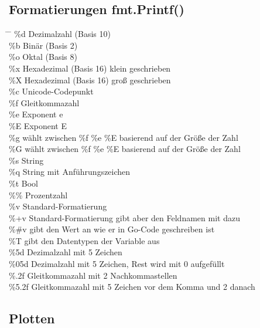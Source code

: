 \documentclass[twoside,a4paper,12pt]{article}
\begin{document}
\subsection{Formatierungen fmt.Printf()}
\begin{tabbing}
 \hspace{2mm} \= \hspace{30mm} \= \kill
  \> \%d \>Dezimalzahl (Basis 10) \\
  \> \%b \>Binär (Basis 2) \\
  \> \%o \>Oktal (Basis 8) \\
  \> \%x \>Hexadezimal (Basis 16) klein geschrieben  \\
  \> \%X \>Hexadezimal (Basis 16) groß geschrieben  \\
  \> \%c \>Unicode-Codepunkt \\
  \> \%f \>Gleitkommazahl  \\
  \> \%e \>Exponent e  \\
  \> \%E \>Exponent E  \\
  \> \%g \>wählt zwischen \%f \%e \%E basierend auf der Größe der Zahl  \\
  \> \%G \>wählt zwischen \%f \%e \%E basierend auf der Größe der Zahl \\
  \> \%s \>String  \\
  \> \%q \>String mit Anführungszeichen \\
  \> \%t \>Bool \\
  \> \%\% \>Prozentzahl \\
  \> \%v \> Standard-Formatierung \\ 
  \> \%+v \> Standard-Formatierung gibt aber den Feldnamen mit dazu \\ 
  \> \%\#v \>gibt den Wert an wie er in Go-Code geschreiben ist \\ 
  \> \%T \> gibt den Datentypen der Variable aus \\
  \> \%5d \> Dezimalzahl mit 5 Zeichen \\ 
  \> \%05d \> Dezimalzahl mit 5 Zeichen, Rest wird mit 0 aufgefüllt \\ 
  \> \%.2f \> Gleitkommazahl mit 2 Nachkommastellen \\ 
  \> \%5.2f \> Gleitkommazahl mit 5 Zeichen vor dem Komma und 2 danach \\
\end{tabbing}

\subsection{Plotten}
\end{document}
